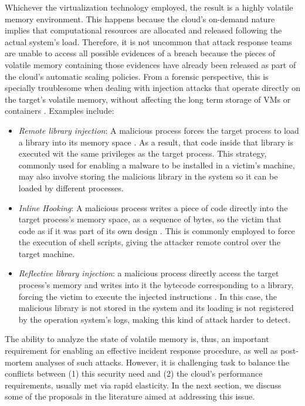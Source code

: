 \documentclass[10pt,journal,compsoc]{IEEEtran}
\begin{document}
Whichever the virtualization technology employed, the result is a highly volatile memory environment.
%
This happens because the cloud's on-demand nature implies that computational resources are allocated and released following the actual system's load.
%
Therefore, it is not uncommon that attack response teams are unable to access all possible evidences of a breach because the pieces of volatile memory containing those evidences have already been released as part of the cloud's automatic scaling policies.
%
From a forensic perspective, this is specially troublesome when dealing with injection attacks that operate directly on the target's volatile memory, without affecting the long term storage of VMs or containers \cite{Case_Memory_Forensics:2014}. 
%
Examples include:

\begin{itemize}
 \item \textit{Remote library injection}: A malicious process forces the target process to load a library into its memory space \cite{Miller_Remote_Library_Injection:2004}.
 As a result, that code inside that library is executed wit the same privileges as the target process. 
 This strategy, commonly used for enabling a malware to be installed in a victim's machine, may also involve storing the malicious library in the system so it can be loaded by different processes.
 

 \item \textit{Inline Hooking}: A malicious process writes a piece of code directly into the target process's memory space, as a sequence of bytes, so the victim that code as if it was part of its own design \cite{inline-hooking:2008}.
%
This is commonly employed to force the execution of shell scripts, giving the attacker remote control over the target machine.


 \item \textit{Reflective library injection}: a malicious process directly access the target process's memory and writes into it the bytecode corresponding to a library, forcing the victim to execute the injected instructions \cite{reflective-lib-injection:2008}.
 In this case, the malicious library is not stored in the system and its loading is not registered by the operation system's logs, making this kind of attack harder to detect.
\end{itemize}	



The ability to analyze the state of volatile memory is, thus, an important requirement for enabling an effective incident response procedure, as well as post-mortem analyses of such attacks.
%
However, it is challenging task to balance the conflicts between (1) this security need and (2) the cloud's performance requirements, usually met via rapid elasticity. 
%
In the next section, we discuss some of the proposals in the literature aimed at addressing this issue.
\end{document}
